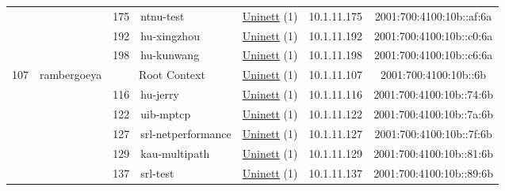 \begin{small}
\begin{center}
\begin{longtable}{|c|c|c|c|c|c|c|c|}
  &  & \tiny{175} & \multicolumn{1}{|l|}{\tiny{ntnu-test}} & \multicolumn{2}{|c|}{\tiny{\href{https://www.uninett.no}{Uninett} (1)}} & \tiny{10.1.11.175} & \tiny{2001:700:4100:10b::af:6a} \\* \cline{3-3}\cline{4-4}\cline{5-5}\cline{6-6}\cline{7-7}\cline{8-8}
  &  & \tiny{192} & \multicolumn{1}{|l|}{\tiny{hu-xingzhou}} & \multicolumn{2}{|c|}{\tiny{\href{https://www.uninett.no}{Uninett} (1)}} & \tiny{10.1.11.192} & \tiny{2001:700:4100:10b::c0:6a} \\* \cline{3-3}\cline{4-4}\cline{5-5}\cline{6-6}\cline{7-7}\cline{8-8}
  &  & \tiny{198} & \multicolumn{1}{|l|}{\tiny{hu-kunwang}} & \multicolumn{2}{|c|}{\tiny{\href{https://www.uninett.no}{Uninett} (1)}} & \tiny{10.1.11.198} & \tiny{2001:700:4100:10b::c6:6a} \\ \hline
 \multirow{13}{*}{\tiny{107}} & \multicolumn{1}{|l|}{\multirow{13}{*}{\tiny{rambergoeya}}} & \multicolumn{2}{|c|}{\tiny{Root Context}} & \multicolumn{2}{|c|}{\tiny{\href{https://www.uninett.no}{Uninett} (1)}} & \tiny{10.1.11.107} & \tiny{2001:700:4100:10b::6b} \\* \cline{3-3}\cline{4-4}\cline{5-5}\cline{6-6}\cline{7-7}\cline{8-8}
  &  & \tiny{116} & \multicolumn{1}{|l|}{\tiny{hu-jerry}} & \multicolumn{2}{|c|}{\tiny{\href{https://www.uninett.no}{Uninett} (1)}} & \tiny{10.1.11.116} & \tiny{2001:700:4100:10b::74:6b} \\* \cline{3-3}\cline{4-4}\cline{5-5}\cline{6-6}\cline{7-7}\cline{8-8}
  &  & \tiny{122} & \multicolumn{1}{|l|}{\tiny{uib-mptcp}} & \multicolumn{2}{|c|}{\tiny{\href{https://www.uninett.no}{Uninett} (1)}} & \tiny{10.1.11.122} & \tiny{2001:700:4100:10b::7a:6b} \\* \cline{3-3}\cline{4-4}\cline{5-5}\cline{6-6}\cline{7-7}\cline{8-8}
  &  & \tiny{127} & \multicolumn{1}{|l|}{\tiny{srl-netperformance}} & \multicolumn{2}{|c|}{\tiny{\href{https://www.uninett.no}{Uninett} (1)}} & \tiny{10.1.11.127} & \tiny{2001:700:4100:10b::7f:6b} \\* \cline{3-3}\cline{4-4}\cline{5-5}\cline{6-6}\cline{7-7}\cline{8-8}
  &  & \tiny{129} & \multicolumn{1}{|l|}{\tiny{kau-multipath}} & \multicolumn{2}{|c|}{\tiny{\href{https://www.uninett.no}{Uninett} (1)}} & \tiny{10.1.11.129} & \tiny{2001:700:4100:10b::81:6b} \\* \cline{3-3}\cline{4-4}\cline{5-5}\cline{6-6}\cline{7-7}\cline{8-8}
  &  & \tiny{137} & \multicolumn{1}{|l|}{\tiny{srl-test}} & \multicolumn{2}{|c|}{\tiny{\href{https://www.uninett.no}{Uninett} (1)}} & \tiny{10.1.11.137} & \tiny{2001:700:4100:10b::89:6b} \\* \cline{3-3}\cline{4-4}\cline{5-5}\cline{6-6}\cline{7-7}\cline{8-8}

\end{longtable}
\end{center}
\end{small}
